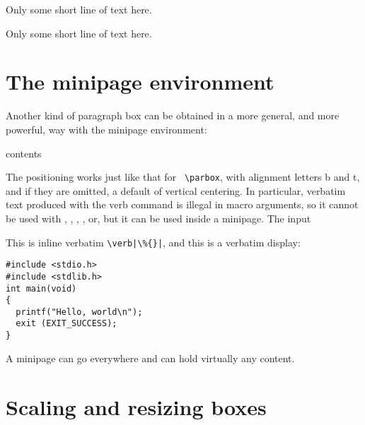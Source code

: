 {\begin{texexample}{}{}
\parbox[b][120pt][t]{100pt}{\lorem}\hspace{1cm}\parbox[b][120pt][t]{100pt}{Only some short line of text here.}



\parbox[b][100pt][t]{100pt}{\lorem}\hspace{1cm}\parbox[b][100pt][c]{100pt}{Only some short line of text here.}

\end{texexample}


\section*{The minipage environment}

Another kind of paragraph box can be obtained in a more general, and
more powerful, way with the minipage environment:

\begin{teX}
\begin{minipage}[position]{width}
   contents
\end{minipage}
\end{teX}


The positioning works just like that for \verb+ \parbox+, with alignment letters b
and t, and if they are omitted, a default of vertical centering.
In particular, verbatim text produced with the verb command is illegal
in macro arguments, so it cannot be used with , , ,
, or, but it can be used inside a minipage. The input


\begin{texexample}{}{}
\begin{minipage}{170pt}
This is inline verbatim \verb=\verb|\%{}|=, and this
is a verbatim display:

\begin{verbatim}
#include <stdio.h>
#include <stdlib.h>
int main(void)
{
  printf("Hello, world\n");
  exit (EXIT_SUCCESS);
}
\end{verbatim}
\end{minipage}

\end{texexample}


A minipage can go everywhere and can hold virtually any content.





\section{Scaling and resizing boxes}

}
